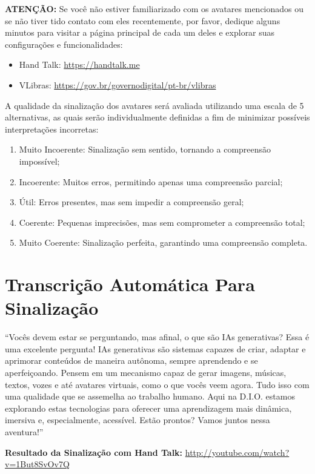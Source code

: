 \noindent
\textbf{ATENÇÃO:} Se você não estiver familiarizado com os avatares mencionados ou se não 
tiver tido contato com eles recentemente, por favor, dedique alguns minutos para visitar a 
página principal de cada um deles e explorar suas configurações e funcionalidades:

\begin{itemize}
    \item Hand Talk: \url{https://handtalk.me}
    \item VLibras: \url{https://gov.br/governodigital/pt-br/vlibras}
\end{itemize}

\noindent
A qualidade da sinalização dos avatares será avaliada utilizando uma escala de 5 
alternativas, as quais serão individualmente definidas a fim de minimizar possíveis 
interpretações incorretas:

\begin{enumerate}
    \item Muito Incoerente: Sinalização sem sentido, tornando a compreensão impossível;
    \item Incoerente: Muitos erros, permitindo apenas uma compreensão parcial;
    \item Útil: Erros presentes, mas sem impedir a compreensão geral;
    \item Coerente: Pequenas imprecisões, mas sem comprometer a compreensão total;
    \item Muito Coerente: Sinalização perfeita, garantindo uma compreensão completa.
\end{enumerate}

\section{Transcrição Automática Para Sinalização}

\noindent
``Vocês devem estar se perguntando, mas afinal, o que são IAs generativas? Essa é uma 
excelente pergunta!
IAs generativas são sistemas capazes de criar, adaptar e aprimorar conteúdos de maneira 
autônoma, sempre aprendendo e se aperfeiçoando.
Pensem em um mecanismo capaz de gerar imagens, músicas, textos, vozes e até avatares 
virtuais, como o que vocês veem agora. Tudo isso com uma qualidade que se assemelha ao 
trabalho humano.
Aqui na D.I.O. estamos explorando estas tecnologias para oferecer uma aprendizagem mais 
dinâmica, imersiva e, especialmente, acessível.
Estão prontos? Vamos juntos nessa aventura!''

\noindent
\textbf{Resultado da Sinalização com Hand Talk:} \url{http://youtube.com/watch?v=1But8SvOv7Q}

